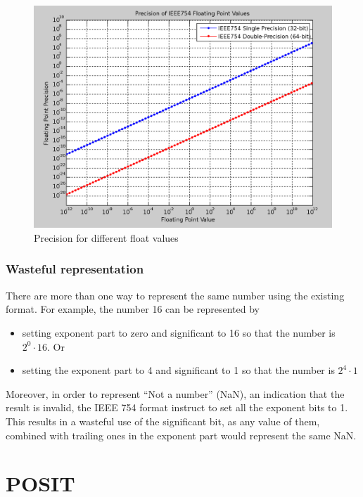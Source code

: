\documentclass[10pt]{article}
\begin{document}
\begin{figure}[h]
  \centering
  \includegraphics[width=\textwidth, height=0.3\paperheight]{1280px-IEEE754}
  \caption{Precision for different float values}\label{prec_value}
\end{figure}

\subsubsection{Wasteful representation}\label{sec:wast-repr}

There are more than one way to represent the same number using the existing
format. For example, the number 16 can be represented by
\begin{itemize}
  \item setting exponent part to zero and significant to 16 so that the number
    is ${2}^{0}\cdot 16$. Or
  \item setting the exponent part to 4 and significant to 1 so that the number
  is ${2}^{4} \cdot 1$
\end{itemize}

Moreover, in order to represent ``Not a number'' (NaN), an indication that the
result is invalid, the IEEE 754 format instruct to set all the exponent bits to
1. This results in a wasteful use of the significant bit, as any value of them,
combined with trailing ones in the exponent part would represent the same NaN.

\section{POSIT}\label{sec:posit}
\end{document}
